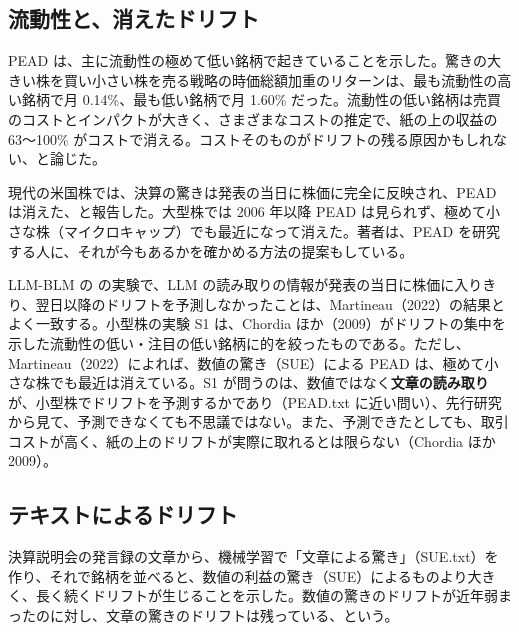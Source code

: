 \subsection{流動性と、消えたドリフト}

\begin{paperbox}
PEAD は、主に流動性の極めて低い銘柄で起きていることを示した。驚きの大きい株を買い小さい株を売る戦略の時価総額加重のリターンは、最も流動性の高い銘柄で月 0.14\%、最も低い銘柄で月 1.60\% だった。流動性の低い銘柄は売買のコストとインパクトが大きく、さまざまなコストの推定で、紙の上の収益の 63〜100\% がコストで消える。コストそのものがドリフトの残る原因かもしれない、と論じた。
\end{paperbox}

\begin{paperbox}
現代の米国株では、決算の驚きは発表の当日に株価に完全に反映され、PEAD は消えた、と報告した。大型株では 2006 年以降 PEAD は見られず、極めて小さな株（マイクロキャップ）でも最近になって消えた。著者は、PEAD を研究する人に、それが今もあるかを確かめる方法の提案もしている。
\end{paperbox}

\begin{projbox}
LLM-BLM の \SP{} の実験で、LLM の読み取りの情報が発表の当日に株価に入りきり、翌日以降のドリフトを予測しなかったことは、Martineau（2022）の結果とよく一致する。小型株の実験 S1 は、Chordia ほか（2009）がドリフトの集中を示した流動性の低い・注目の低い銘柄に的を絞ったものである。ただし、Martineau（2022）によれば、数値の驚き（SUE）による PEAD は、極めて小さな株でも最近は消えている。S1 が問うのは、数値ではなく\textbf{文章の読み取り}が、小型株でドリフトを予測するかであり（PEAD.txt に近い問い）、先行研究から見て、予測できなくても不思議ではない。また、予測できたとしても、取引コストが高く、紙の上のドリフトが実際に取れるとは限らない（Chordia ほか 2009）。
\end{projbox}

\subsection{テキストによるドリフト}

\begin{paperbox}
決算説明会の発言録の文章から、機械学習で「文章による驚き」（SUE.txt）を作り、それで銘柄を並べると、数値の利益の驚き（SUE）によるものより大きく、長く続くドリフトが生じることを示した。数値の驚きのドリフトが近年弱まったのに対し、文章の驚きのドリフトは残っている、という。
\end{paperbox}

